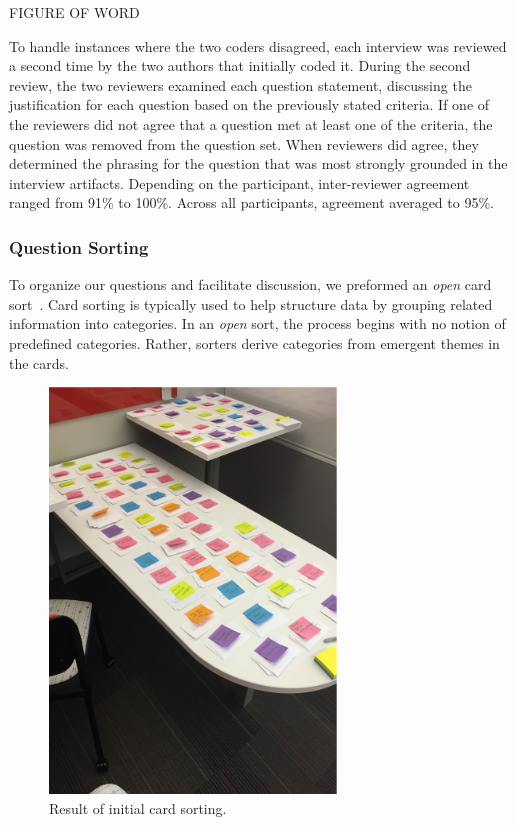 \documentclass[conference]{IEEEtran}
\begin{document}
FIGURE OF WORD


To handle instances where the two coders disagreed, each interview was reviewed a second time by the two authors that initially coded it.
During the second review, the two reviewers examined each question statement, discussing the justification for each question based on the previously stated criteria.
If one of the reviewers did not agree that a question met at least one of the criteria, the question was removed from the question set. 
When reviewers did agree, they determined the phrasing for the question that was most strongly grounded in the interview artifacts. 
Depending on the participant, inter-reviewer agreement ranged from 91\% to 100\%. Across all participants, agreement averaged to 95\%.

\subsubsection{Question Sorting}
To organize our questions and facilitate discussion, we preformed an \textit{open} card sort~\cite{hudson2013sorting}. 
Card sorting is typically used to help structure data by grouping related information into categories. 
In an \textit{open} sort, the process begins with no notion of predefined categories. 
Rather, sorters derive categories from emergent themes in the cards. 

\begin{figure}
\centering
\includegraphics[width=3in]{Images/notecards.pdf}
\caption{Result of initial card sorting.}
\label{fig:cardsort} 
\end{figure}
\end{document}
